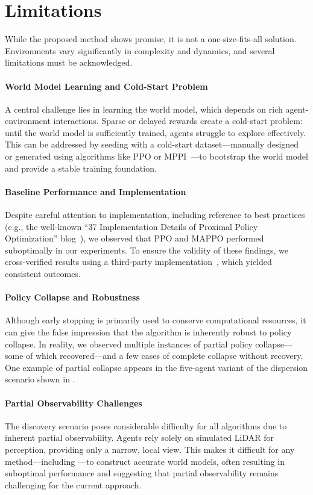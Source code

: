 \section{Limitations}

While the proposed method shows promise, it is not a one-size-fits-all solution. Environments vary significantly in complexity and dynamics, and several limitations must be acknowledged.

\paragraph{World Model Learning and Cold-Start Problem}
A central challenge lies in learning the world model, which depends on rich agent-environment interactions. Sparse or delayed rewards create a cold-start problem: until the world model is sufficiently trained, agents struggle to explore effectively. This can be addressed by seeding with a cold-start dataset---manually designed or generated using algorithms like PPO or MPPI~\cite{Alvarez24}---to bootstrap the world model and provide a stable training foundation.

\paragraph{Baseline Performance and Implementation}
Despite careful attention to implementation, including reference to best practices (e.g., the well-known ``37 Implementation Details of Proximal Policy Optimization'' blog~\cite{Shengyi22}), we observed that PPO and MAPPO performed suboptimally in our experiments. To ensure the validity of these findings, we cross-verified results using a third-party implementation~\cite{Bettini24}, which yielded consistent outcomes.

\paragraph{Policy Collapse and Robustness}
Although early stopping is primarily used to conserve computational resources, it can give the false impression that the algorithm is inherently robust to policy collapse. In reality, we observed multiple instances of partial policy collapse---some of which recovered---and a few cases of complete collapse without recovery. One example of partial collapse appears in the five-agent variant of the dispersion scenario shown in .

\paragraph{Partial Observability Challenges}
The discovery scenario poses considerable difficulty for all algorithms due to inherent partial observability. Agents rely solely on simulated LiDAR for perception, providing only a narrow, local view. This makes it difficult for any method---including \fname{}---to construct accurate world models, often resulting in suboptimal performance and suggesting that partial observability remains challenging for the current approach.

